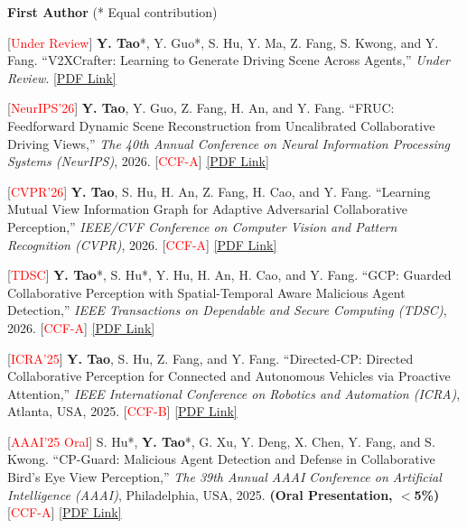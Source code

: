 \documentclass[letterpaper,11pt]{article}
\newcommand{\pdflink}[1]{\href{#1}{[PDF Link]}}
\begin{document}
{{{{{{\large\textbf{First Author} (* Equal contribution)



\begin{justify}
    \normalsize
    [\textcolor{red}{Under Review}] \textbf{Y. Tao}*, Y. Guo*, S. Hu, Y. Ma, Z. Fang, S. Kwong, and Y. Fang. ``V2XCrafter: Learning to Generate Driving Scene Across Agents,'' \textit{Under Review}. \pdflink{https://arxiv.org/pdf/2605.29471}
\end{justify}

\begin{justify}
    \normalsize
    [\textcolor{red}{NeurIPS'26}] \textbf{Y. Tao}, Y. Guo, Z. Fang, H. An, and Y. Fang. ``FRUC: Feedforward Dynamic Scene Reconstruction from Uncalibrated Collaborative Driving Views,'' \textit{The 40th Annual Conference on Neural Information Processing Systems (NeurIPS)}, 2026. [\textcolor{red}{CCF-A}] \pdflink{https://arxiv.org/pdf/2605.29997}
\end{justify}

\begin{justify}
    \normalsize
    [\textcolor{red}{CVPR'26}] \textbf{Y. Tao}, S. Hu, H. An, Z. Fang, H. Cao, and Y. Fang. ``Learning Mutual View Information Graph for Adaptive Adversarial Collaborative Perception,'' \textit{IEEE/CVF Conference on Computer Vision and Pattern Recognition (CVPR)}, 2026. [\textcolor{red}{CCF-A}] \pdflink{https://arxiv.org/pdf/2602.19596}
\end{justify}

\begin{justify}
    \normalsize
    [\textcolor{red}{TDSC}] \textbf{Y. Tao}*, S. Hu*, Y. Hu, H. An, H. Cao, and Y. Fang. ``GCP: Guarded Collaborative Perception with Spatial-Temporal Aware Malicious Agent Detection,'' \textit{IEEE Transactions on Dependable and Secure Computing (TDSC)}, 2026. [\textcolor{red}{CCF-A}] \pdflink{https://arxiv.org/pdf/2501.02450}
\end{justify}

\begin{justify}
    \normalsize
    [\textcolor{red}{ICRA'25}] \textbf{Y. Tao}, S. Hu, Z. Fang, and Y. Fang. ``Directed-CP: Directed Collaborative Perception for Connected and Autonomous Vehicles via Proactive Attention,'' \textit{IEEE International Conference on Robotics and Automation (ICRA)}, Atlanta, USA, 2025. [\textcolor{red}{CCF-B}] \pdflink{https://arxiv.org/pdf/2409.08840}
\end{justify}

\begin{justify}
    \normalsize
    [\textcolor{red}{AAAI'25 Oral}] S. Hu*, \textbf{Y. Tao}*, G. Xu, Y. Deng, X. Chen, Y. Fang, and S. Kwong. ``CP-Guard: Malicious Agent Detection and Defense in Collaborative Bird's Eye View Perception,'' \textit{The 39th Annual AAAI Conference on Artificial Intelligence (AAAI)}, Philadelphia, USA, 2025. \textbf{(Oral Presentation, $<$5\%)} [\textcolor{red}{CCF-A}] \pdflink{https://ojs.aaai.org/index.php/AAAI/article/view/34486}
\end{justify}

}}}}}}
\end{document}

